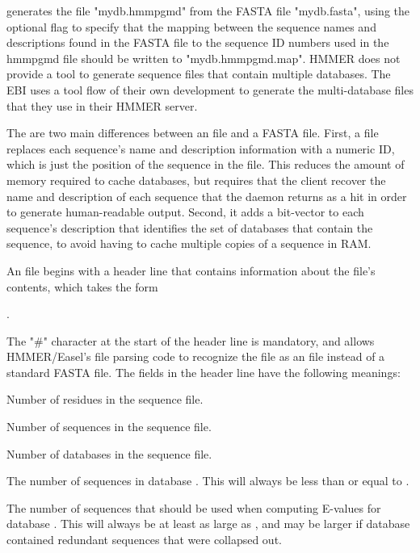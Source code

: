 \documentclass[notoc,justified]{tufte-book}    %
\begin{document}
generates the  file "mydb.hmmpgmd" from the FASTA file "mydb.fasta", using the optional  flag to specify that the mapping between the sequence names and descriptions found in the FASTA file to the sequence ID numbers used in the hmmpgmd file should be written to "mydb.hmmpgmd.map".  HMMER does not provide a tool to generate sequence files that contain multiple databases.  The EBI uses a tool flow of their own development to generate the multi-database files that they use in their HMMER server.

The are two main differences between an  file and a FASTA file.  First, a  file replaces each sequence's name and description information with a numeric ID, which is just the position of the sequence in the file.  This reduces the amount of memory required to cache databases, but requires that the client recover the name and description of each sequence that the daemon returns as a hit in order to generate human-readable output.  Second, it adds a bit-vector to each sequence's description that identifies the set of databases that contain the sequence, to avoid having to cache multiple copies of a sequence in RAM.  

An  file begins with a header line that contains information about the file's contents, which takes the form 

.

The "\#" character at the start of the header line is mandatory, and allows HMMER/Easel's file parsing code to recognize the file as an  file instead of a standard FASTA file.  The fields in the header line have the following meanings:

\begin{sreitems}{}

\item [\monob{res\_cnt}] Number of residues in the sequence file.

\item [\monob{seq\_cnt}] Number of sequences in the sequence file. 

\item [\monob{db\_cnt}] Number of databases in the sequence file. 

\item [\monob{cnt\_i}] The number of sequences in database . This will always be less than or equal to .
 
\item [\monob{fullcnt\_i}] The number of sequences that should be used when computing E-values for database .  This will always be at least as large as , and may be larger if database  contained redundant sequences that were collapsed out.

\end{sreitems}
\end{document}
